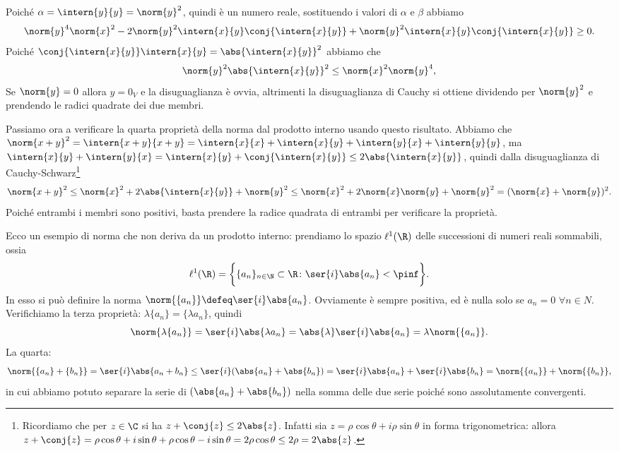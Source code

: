 Poiché $\alpha=\intern{  y}{  y}=\norm{  y}^2$, quindi è un numero reale, sostituendo i valori di $\alpha$ e $\beta$ abbiamo
\begin{equation*}
	\norm{  y}^4\norm{  x}^2-2\norm{  y}^2\intern{  x}{  y}\conj{\intern{  x}{  y}}+\norm{  y}^2\intern{  x}{  y}\conj{\intern{  x}{  y}}\geq 0.
\end{equation*}
Poiché $\conj{\intern{  x}{  y}}\intern{  x}{  y}=\abs{\intern{  x}{  y}}^2$ abbiamo che
\begin{equation*}
	\norm{  y}^2\abs{\intern{  x}{  y}}^2\leq\norm{  x}^2\norm{  y}^4,
\end{equation*}
Se $\norm{  y}=0$ allora $  y=0_V$ e la disuguaglianza è ovvia, altrimenti la disuguaglianza di Cauchy si ottiene dividendo per $\norm{  y}^2$ e prendendo le radici quadrate dei due membri.

Passiamo ora a verificare la quarta proprietà della norma dal prodotto interno usando questo risultato.
Abbiamo che $\norm{  x+  y}^2=\intern{  x+  y}{  x+  y}=\intern{  x}{  x}+\intern{  x}{  y}+\intern{  y}{  x}+\intern{  y}{  y}$, ma $\intern{  x}{  y}+\intern{  y}{  x}=\intern{  x}{  y}+\conj{\intern{  x}{  y}}\leq 2\abs{\intern{  x}{  y}}$, quindi dalla disuguaglianza di Cauchy-Schwarz\footnote{Ricordiamo che per $z\in\C$ si ha $z+\conj{z}\leq2\abs{z}$. Infatti sia $z=\rho\cos\theta+i\rho\sin\theta$ in forma trigonometrica: allora $z+\conj{z}=\rho\cos\theta+i\sin\theta+\rho\cos\theta-i\sin\theta=2\rho\cos\theta\leq 2\rho=2\abs{z}$. }
\begin{equation*}
	\norm{  x+  y}^2\leq \norm{  x}^2+2\abs{\intern{  x}{  y}}+\norm{  y}^2
	\leq\norm{  x}^2+2\norm{  x}\norm{  y}+\norm{  y}^2=(\norm{  x}+\norm{  y})^2.
\end{equation*}
Poiché entrambi i membri sono positivi, basta prendere la radice quadrata di entrambi per verificare la proprietà.

Ecco un esempio di norma che non deriva da un prodotto interno: prendiamo lo spazio $\ell^1(\R)$ delle successioni di numeri reali sommabili, ossia
\begin{equation*}
	\ell^1(\R)=\bigg\{\{a_n\}_{n\in\N}\subset\R\colon\ser{i}\abs{a_n}<\pinf\bigg\}.
\end{equation*}
In esso si può definire la norma $\norm{\{a_n\}}\defeq\ser{i}\abs{a_n}$.
Ovviamente è sempre positiva, ed è nulla solo se $a_n=0$ $\forall n\in N$.
Verifichiamo la terza proprietà: $\lambda\{a_n\}=\{\lambda a_n\}$, quindi
\begin{equation*}
	\norm{\lambda\{a_n\}}=\ser{i}\abs{\lambda a_n}=\abs{\lambda}\ser{i}\abs{a_n}=\lambda\norm{\{a_n\}}.
\end{equation*}
La quarta:
\begin{equation*}
	\norm{\{a_n\}+\{b_n\}}=\ser{i}\abs{a_n+b_n}\leq\ser{i}(\abs{a_n}+\abs{b_n})
	=\ser{i}\abs{a_n}+\ser{i}\abs{b_n}=\norm{\{a_n\}}+\norm{\{b_n\}},
\end{equation*}
in cui abbiamo potuto separare la serie di $(\abs{a_n}+\abs{b_n})$ nella somma delle due serie poiché sono assolutamente convergenti.

